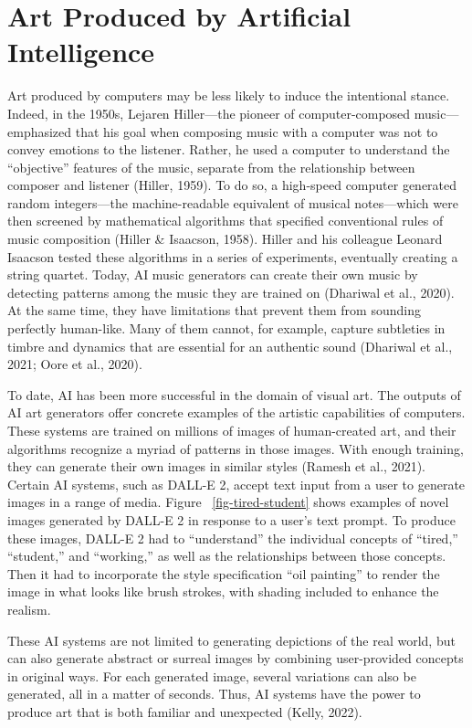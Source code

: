 \documentclass[12pt,twoside]{reedthesis}
\begin{document}
\section{Art Produced by Artificial Intelligence
}
Art produced by computers may be less likely to induce the intentional stance. Indeed, in the 1950s, Lejaren Hiller—the pioneer of computer-composed music—emphasized that his goal when composing music with a computer was not to convey emotions to the listener. Rather, he used a computer to understand the “objective” features of the music, separate from the relationship between composer and listener (Hiller, 1959). To do so, a high-speed computer generated random integers—the machine-readable equivalent of musical notes—which were then screened by mathematical algorithms that specified conventional rules of music composition (Hiller \& Isaacson, 1958). Hiller and his colleague Leonard Isaacson tested these algorithms in a series of experiments, eventually creating a string quartet. Today, AI music generators can create their own music by detecting patterns among the music they are trained on (Dhariwal et al., 2020). At the same time, they have limitations that prevent them from sounding perfectly human-like. Many of them cannot, for example, capture subtleties in timbre and dynamics that are essential for an authentic sound (Dhariwal et al., 2021; Oore et al., 2020). 

To date, AI has been more successful in the domain of visual art. The outputs of AI art generators offer concrete examples of the artistic capabilities of computers. These systems are trained on millions of images of human-created art, and their algorithms recognize a myriad of patterns in those images. With enough training, they can generate their own images in similar styles (Ramesh et al., 2021). Certain AI systems, such as DALL-E 2, accept text input from a user to generate images in a range of media. Figure ~\ref{fig-tired-student} shows examples of novel images generated by DALL-E 2 in response to a user’s text prompt. To produce these images, DALL-E 2 had to “understand” the individual concepts of “tired,” “student,” and “working,” as well as the relationships between those concepts. Then it had to incorporate the style specification “oil painting” to render the image in what looks like brush strokes, with shading included to enhance the realism. 

These AI systems are not limited to generating depictions of the real world, but can also generate abstract or surreal images by combining user-provided concepts in original ways. For each generated image, several variations can also be generated, all in a matter of seconds. Thus, AI systems have the power to produce art that is both familiar and unexpected (Kelly, 2022).
\end{document}

